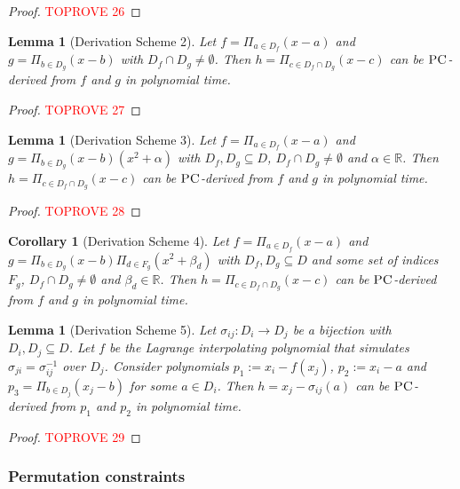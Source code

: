 \documentclass[11pt]{article}
\newcommand{\PC}{\textsc{PC}}
\newcommand{\1}{\textbf{1}}
\newtheorem{lemma}[theorem]{Lemma}
\newtheorem{corollary}[theorem]{Corollary}
\begin{document}
\begin{proof}\textcolor{red}{TOPROVE 26}\end{proof}

\begin{lemma}[Derivation Scheme 2]\label{th:derivation_scheme_2}
    Let $f = \Pi_{a \in D_f} (x-a)$ and $g = \Pi_{b \in D_g}(x-b)$ with $D_f \cap D_g \neq \emptyset$. Then $h = \Pi_{c \in D_f \cap D_g}(x-c)$ can be $\PC$-derived from $f$ and $g$ in polynomial time.
\end{lemma}

\begin{proof}\textcolor{red}{TOPROVE 27}\end{proof}

\begin{lemma}[Derivation Scheme 3]
    Let $f = \Pi_{a \in D_f} (x-a)$ and $g = \Pi_{b \in D_g}(x-b)(x^2 + \alpha)$ with $D_f, D_g \subseteq D$, $D_f \cap D_g \neq \emptyset$ and $\alpha \in \mathbb{R}$. Then $h = \Pi_{c \in D_f \cap D_g}(x-c)$ can be $\PC$-derived from $f$ and $g$ in polynomial time.
\end{lemma}

\begin{proof}\textcolor{red}{TOPROVE 28}\end{proof}

\begin{corollary}[Derivation Scheme 4]
    Let $f = \Pi_{a \in D_f} (x-a)$ and $g = \Pi_{b \in D_g}(x-b)\Pi_{d \in F_g}(x^2 + \beta_d)$ with $D_f, D_g \subseteq D$ and some set of indices $F_g$, $D_f \cap D_g \neq \emptyset$ and $\beta_d \in \mathbb{R}$. Then $h = \Pi_{c \in D_f \cap D_g}(x-c)$ can be $\PC$-derived from $f$ and $g$ in polynomial time.
\end{corollary}

\begin{lemma}[Derivation Scheme 5]
    Let $\sigma_{ij}:D_i \rightarrow D_j$ be a bijection with $D_i, D_j \subseteq D$. Let $f$ be the Lagrange interpolating polynomial that simulates $\sigma_{ji} = \sigma_{ij}^{-1}$ over $D_j$. Consider polynomials $p_1 := x_i - f(x_j)$, $p_2 := x_i - a$ and $p_3 = \Pi_{b \in D_j}(x_j - b)$ for some $a \in D_i$. Then $h = x_j - \sigma_{ij}(a)$ can be $\PC$-derived from $p_1$ and $p_2$ in polynomial time.
\end{lemma}

\begin{proof}\textcolor{red}{TOPROVE 29}\end{proof}

\subsubsection{Permutation constraints}\label{sect:permutation_constraints}
\end{document}
